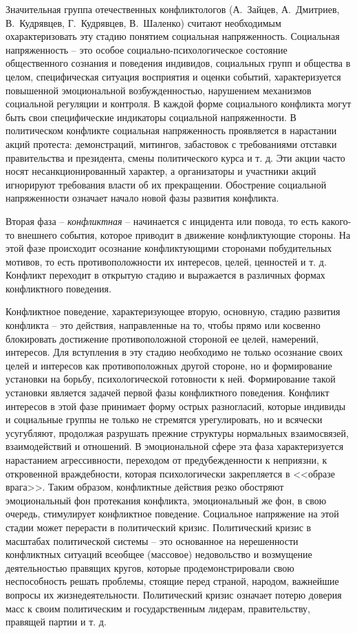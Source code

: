 Значительная группа отечественных конфликтологов (А.~Зайцев, А.~Дмитриев,
В.~Кудрявцев, Г.~Кудрявцев, В.~Шаленко) считают необходимым охарактеризовать
эту стадию понятием социальная напряженность. Социальная напряженность -- это
особое социально-психологическое состояние общественного сознания и поведения
индивидов, социальных групп и общества в целом, специфическая ситуация
восприятия и оценки событий, характеризуется повышенной эмоциональной
возбужденностью, нарушением механизмов социальной регуляции и контроля. В
каждой форме социального конфликта могут быть свои специфические индикаторы
социальной напряженности. В политическом конфликте социальная напряженность
проявляется в нарастании акций протеста: демонстраций, митингов, забастовок с
требованиями отставки правительства и президента, смены политического курса и
т. д. Эти акции часто носят несанкционированный характер, а организаторы и
участники акций игнорируют требования власти об их прекращении. Обострение
социальной напряженности означает начало новой фазы развития конфликта.

Вторая фаза -- \emph{конфликтная} -- начинается с инцидента или повода, то есть
какого-то внешнего события, которое приводит в движение конфликтующие стороны.
На этой фазе происходит осознание конфликтующими сторонами побудительных
мотивов, то есть противоположности их интересов, целей, ценностей и т. д.
Конфликт переходит в открытую стадию и выражается в различных формах
конфликтного поведения.

Конфликтное поведение, характеризующее вторую, основную, стадию развития
конфликта -- это действия, направленные на то, чтобы прямо или косвенно
блокировать достижение противоположной стороной ее целей, намерений, интересов.
Для вступления в эту стадию необходимо не только осознание своих целей и
интересов как противоположных другой стороне, но и формирование установки на
борьбу, психологической готовности к ней. Формирование такой установки является
задачей первой фазы конфликтного поведения. Конфликт интересов в этой фазе
принимает форму острых разногласий, которые индивиды и социальные группы не
только не стремятся урегулировать, но и всячески усугубляют, продолжая
разрушать прежние структуры нормальных взаимосвязей, взаимодействий и
отношений. В эмоциональной сфере эта фаза характеризуется нарастанием
агрессивности, переходом от предубежденности к неприязни, к откровенной
враждебности, которая психологически закрепляется в <<образе врага>>. Таким
образом, конфликтные действия резко обостряют эмоциональный фон протекания
конфликта, эмоциональный же фон, в свою очередь, стимулирует конфликтное
поведение. Социальное напряжение на этой стадии может перерасти в политический
кризис. Политический кризис в масштабах политической системы -- это основанное
на нерешенности конфликтных ситуаций всеобщее (массовое) недовольство и
возмущение деятельностью правящих кругов, которые продемонстрировали свою
неспособность решать проблемы, стоящие перед страной, народом, важнейшие
вопросы их жизнедеятельности. Политический кризис означает потерю доверия масс
к своим политическим и государственным лидерам, правительству, правящей партии
и т. д.

